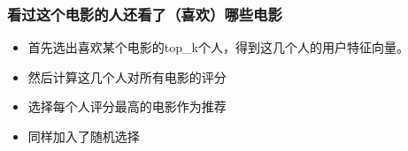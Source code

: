 \documentclass[11pt]{article}
\providecommand{\tightlist}{%
      \setlength{\itemsep}{0pt}\setlength{\parskip}{0pt}}
\begin{document}
    \subsubsection{看过这个电影的人还看了（喜欢）哪些电影}\label{ux770bux8fc7ux8fd9ux4e2aux7535ux5f71ux7684ux4ebaux8fd8ux770bux4e86ux559cux6b22ux54eaux4e9bux7535ux5f71}

\begin{itemize}
\tightlist
\item
  首先选出喜欢某个电影的top\_k个人，得到这几个人的用户特征向量。
\item
  然后计算这几个人对所有电影的评分
\item
  选择每个人评分最高的电影作为推荐
\item
  同样加入了随机选择
\end{itemize}
\end{document}
